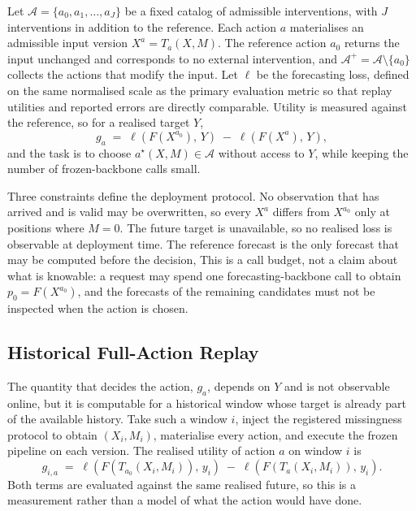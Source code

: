 \documentclass{article}
\newcommand{\calA}{\mathcal{A}}
\newcommand{\loss}{\ell}
\begin{document}
Let $\calA = \{a_0, a_1, \dots, a_J\}$ be a fixed catalog of admissible interventions, with
$J$ interventions in addition to the reference. Each action $a$ materialises an admissible
input version $X^{a} = T_a(X, M)$. The reference action $a_0$ returns the input unchanged and
corresponds to no external intervention, and $\calA^{+} = \calA \setminus \{a_0\}$ collects
the actions that modify the input. Let $\loss$ be the forecasting loss, defined on the same
normalised scale as the primary evaluation metric so that replay utilities and reported errors
are directly comparable. Utility is measured against the reference, so for a realised target
$Y$,
\begin{equation}
  g_a \;=\; \loss\!\left(F(X^{a_0}),\, Y\right) \;-\; \loss\!\left(F(X^{a}),\, Y\right),
  \label{eq:utility}
\end{equation}
and the task is to choose $a^\star(X, M) \in \calA$ without access to $Y$, while keeping the
number of frozen-backbone calls small.

Three constraints define the deployment protocol. No observation that has arrived and is valid
may be overwritten, so every $X^{a}$ differs from $X^{a_0}$ only at positions where $M = 0$.
The future target is unavailable, so no realised loss is observable at deployment time. The
reference forecast is the only forecast that may be computed before the decision, This is a
call budget, not a claim about what is knowable: a request may spend one
forecasting-backbone call to obtain $p_0 = F(X^{a_0})$, and the forecasts of the remaining
candidates must not be inspected when the action is chosen.

\subsection{Historical Full-Action Replay}
\label{sec:method-replay}
The quantity that decides the action, $g_a$, depends on $Y$ and is not observable online, but it
is computable for a historical window whose target is already part of the available history.
Take such a window $i$, inject the registered missingness protocol to obtain $(X_i, M_i)$,
materialise every action, and execute the frozen pipeline on each version. The realised utility
of action $a$ on window $i$ is
\begin{equation}
  g_{i,a} \;=\; \loss\!\left(F(T_{a_0}(X_i, M_i)),\, y_i\right)
  \;-\; \loss\!\left(F(T_{a}(X_i, M_i)),\, y_i\right).
  \label{eq:replay-gain}
\end{equation}
Both terms are evaluated against the same realised future, so this is a measurement rather
than a model of what the action would have done.
\end{document}
